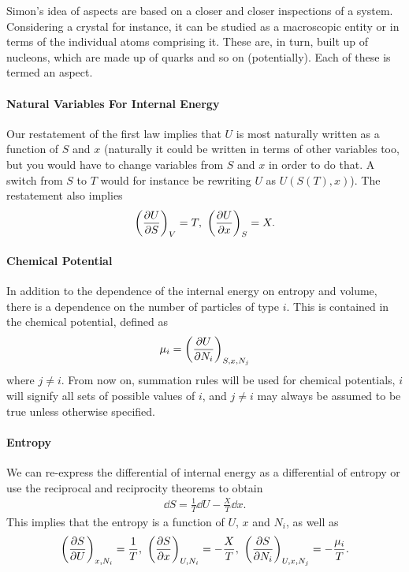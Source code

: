 Simon's idea of aspects are based on a closer and closer inspections of a system. Considering a crystal for instance, it can be studied as a macroscopic entity or in terms of the individual atoms comprising it. These are, in turn, built up of nucleons, which are made up of quarks and so on (potentially). Each of these is termed an aspect.

\paragraph{Natural Variables For Internal Energy}
Our restatement of the first law implies that $U$ is most naturally written as a function of $S$ and $x$ (naturally it could be written in terms of other variables too, but you would have to change variables from $S$ and $x$ in order to do that. A switch from $S$ to $T$ would for instance be rewriting $U$ as $U(S(T), x)$). The restatement also implies
\begin{align*}
	\left(\pdv{U}{S}\right)_{V} = T,\ \left(\pdv{U}{x}\right)_{S} = X.
\end{align*}

\paragraph{Chemical Potential}
In addition to the dependence of the internal energy on entropy and volume, there is a dependence on the number of particles of type $i$. This is contained in the chemical potential, defined as
\begin{align*}
	\mu_{i} = \left(\pdv{U}{N_{i}}\right)_{S, x, N_{j}}
\end{align*}
where $j \neq i$. From now on, summation rules will be used for chemical potentials, $i$ will signify all sets of possible values of $i$, and $j\neq i$ may always be assumed to be true unless otherwise specified.

\paragraph{Entropy}
We can re-express the differential of internal energy as a differential of entropy or use the reciprocal and reciprocity theorems to obtain
\begin{align*}
	\dd{S} = \frac{1}{T}\dd{U} - \frac{X}{T}\dd{x}.
\end{align*}
This implies that the entropy is a function of $U$, $x$ and $N_{i}$, as well as
\begin{align*}
	\left(\pdv{S}{U}\right)_{x, N_{i}} = \frac{1}{T},\ \left(\pdv{S}{x}\right)_{U, N_{i}} = -\frac{X}{T},\ \left(\pdv{S}{N_{i}}\right)_{U, x, N_{j}} = -\frac{\mu_{i}}{T}.
\end{align*}

